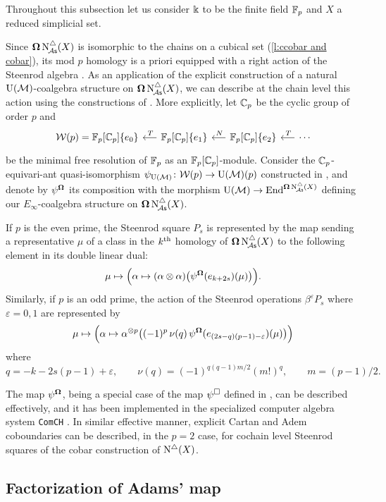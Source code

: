 Throughout this subsection let us consider $\Bbbk$ to be the finite field ${\mathbb{F}_p}$ and $X$ a reduced simplicial set.

Since $\operatorname{\mathbf{\Omega}} \operatorname{N^{\triangle}_{\!{\mathcal{A}\mathsf{s}}}}(X)$ is isomorphic to the chains on a cubical set (\cref{l:ccobar and cobar}), its mod $p$ homology is a priori equipped with a right action of the Steenrod algebra \cite{steenrod1962cohomology, milnor1958steenrod}.
As an application of the explicit construction of a natural ${\operatorname{U}(\mathcal{M})}$-coalgebra structure on $\operatorname{\mathbf{\Omega}} \operatorname{N^{\triangle}_{\!{\mathcal{A}\mathsf{s}}}}(X)$, we can describe at the chain level this action using the constructions of \cite{medina2021may_st}.
More explicitly, let ${\mathbb{C}_p}$ be the cyclic group of order $p$ and
\[
\begin{tikzcd} [column sep = .5cm]
	\cW(p) = \Fp[\Cp]\{e_0\} & \arrow[l, "\,T"'] \Fp[\Cp]\{e_1\} & \arrow[l, "\,N"'] \Fp[\Cp]\{e_2\} & \arrow[l, "\,T"'] \dotsb
\end{tikzcd}
\]
be the minimal free resolution of ${\mathbb{F}_p}$ as an ${\mathbb{F}_p}[{\mathbb{C}_p}]$-module.
Consider the ${\mathbb{C}_p}$-equivari-ant quasi-isomorphism $\psi_{\operatorname{U}(\mathcal{M})} \colon \mathcal{W}(p) \to {\operatorname{U}(\mathcal{M})}(p)$ constructed in \cite{medina2021may_st}, and denote by $\psi^{\operatorname{\mathbf{\Omega}}}$ its composition with the morphism ${\operatorname{U}(\mathcal{M})} \to \mathrm{End}^{\operatorname{\mathbf{\Omega}} \operatorname{N^{\triangle}_{\!{\mathcal{A}\mathsf{s}}}}(X)}$ defining our $E_\infty$-coalgebra structure on $\operatorname{\mathbf{\Omega}} \operatorname{N^{\triangle}_{\!{\mathcal{A}\mathsf{s}}}}(X)$.

If $p$ is the even prime, the Steenrod square $P_s$ is represented by the map sending a representative $\mu$ of a class in the $k^{\mathrm{th}}$ homology of $\operatorname{\mathbf{\Omega}} \operatorname{N^{\triangle}_{\!{\mathcal{A}\mathsf{s}}}}(X)$ to the following element in its double linear dual:
\[
\mu \mapsto
\Big( \alpha \mapsto (\alpha \otimes \alpha) \big( \psi^{\operatorname{\mathbf{\Omega}}}(e_{k+2s})(\mu) \big) \Big).
\]
Similarly, if $p$ is an odd prime, the action of the Steenrod operations $\beta^\varepsilon P_{s}$ where $\varepsilon = 0,1$ are represented by
\[
\mu \mapsto
\Big( \alpha \mapsto \alpha^{\otimes p} \big( (-1)^p \, \nu(q) \, \psi^{\operatorname{\mathbf{\Omega}}}(e_{(2s-q)(p-1)-\varepsilon})(\mu) \big) \Big)
\]
where
\[
q = -k -2s(p-1)+\varepsilon, \qquad
\nu(q) = (-1)^{q(q-1)m/2}(m!)^q, \qquad
m = (p-1)/2.
\]

The map $\psi^{\operatorname{\mathbf{\Omega}}}$, being a special case of the map $\psi^\square$ defined in \cite{medina2021may_st}, can be described effectively, and it has been implemented in the specialized computer algebra system \texttt{ComCH} \cite{medina2021comch}.
In similar effective manner, explicit Cartan and Adem coboundaries \cite{medina2020cartan, medina2021adem} can be described, in the $p = 2$ case, for cochain level Steenrod squares of the cobar construction of $\operatorname{N^{\triangle}}(X)$.

\subsection{Factorization of Adams' map}\label{ss:factorization of adams}

